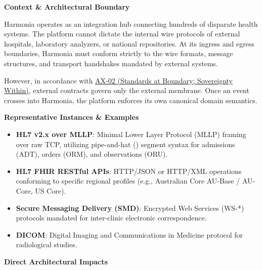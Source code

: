 \par\medskip\textbf{Context \& Architectural Boundary}\par


Harmonia operates as an integration hub connecting hundreds of disparate health systems. The platform cannot dictate the internal wire protocols of external hospitals, laboratory analyzers, or national repositories. At its ingress and egress boundaries, Harmonia must conform strictly to the wire formats, message structures, and transport handshakes mandated by external systems.



However, in accordance with \hyperref[element:eee8c3783d964d18a7f9dcea85fcd4cf]{AX-02 (Standards at Boundary; Sovereignty Within)}, external contracts govern only the external membrane. Once an event crosses into Harmonia, the platform enforces its own canonical domain semantics.



\par\medskip\textbf{Representative Instances \& Examples}\par


\begin{itemize}


\item \textbf{HL7 v2.x over MLLP}: Minimal Lower Layer Protocol (MLLP) framing over raw TCP, utilizing pipe-and-hat (\texttt{}) segment syntax for admissions (ADT), orders (ORM), and observations (ORU).

\item \textbf{HL7 FHIR RESTful APIs}: HTTP/JSON or HTTP/XML operations conforming to specific regional profiles (e.g., Australian Core AU-Base / AU-Core, US Core).

\item \textbf{Secure Messaging Delivery (SMD)}: Encrypted Web Services (WS-*) protocols mandated for inter-clinic electronic correspondence.

\item \textbf{DICOM}: Digital Imaging and Communications in Medicine protocol for radiological studies.

\end{itemize}


\par\medskip\textbf{Direct Architectural Impacts}\par



